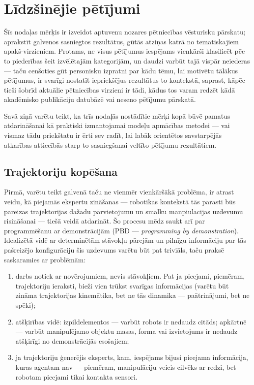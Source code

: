 \documentclass[12pt, a4paper]{article}
\numberwithin{equation}{section} %
\begin{document}
\newpage
\section{Līdzšinējie pētījumi}

Šīs nodaļas mērķis ir izveidot aptuvenu nozares pētniecības vēsturisku pārskatu; aprakstīt galvenos sasniegtos rezultātus, gūtās atziņas katrā no tematiskajiem apakš-virzieniem. Protams, ne visus pētījumus iespējams vienkārši klasificēt pēc to piederības šeit izvēlētajām kategorijām, un daudzi varbūt tajā vispār neiederas --- taču cenšoties gūt personisku izpratni par kādu tēmu, lai motivētu tālākus pētījumus, ir svarīgi nostatīt iepriekšējus rezultātus to kontekstā, saprast, kāpēc tieši šobrīd aktuālie pētniecības virzieni ir tādi, kādus tos varam redzēt kādā akadēmisko publikāciju datubāzē vai neseno pētījumu pārskatā.

Savā ziņā varētu teikt, ka trīs nodaļās nostādītie mērķi kopā būvē pamatus atdarināšanai kā praktiski izmantojamai modeļu apmācības metodei --- vai vismaz tādu priekštatu ir ērti sev radīt, lai labāk orientētos savstarpējās atkarības attiecībās starp to sasniegšanai veltīto pētījumu rezultātiem.

\subsection{Trajektoriju kopēšana}

Pirmā, varētu teikt galvenā taču ne vienmēr vienkāršākā problēma, ir atrast veidu, kā piejamās ekspertu zināšanas --- robotikas kontekstā tās parasti būs pareizas trajektorijas dažādu pārvietojumu un smalku manpiulācijas uzdevumu risināšanai --- tiešā veidā atdarināt. Šo procesu mēdz saukt arī par programmēšanu ar demonstrācijām (PBD --- \textit{programming by demonstration})\cite{muench1994robot,billard2008handbook}. Idealizētā vidē ar determinētām stāvokļu pārejām un pilnīgu informāciju par tās pašreizējo konfigurāciju šis uzdevums varētu būt pat triviāls, taču praksē saskaramies ar problēmām:

\begin{enumerate}
    \item darbs notiek ar novērojumiem, nevis stāvokļiem. Pat ja pieejami, piemēram, trajektoriju ieraksti, bieži vien trūkst svarīgas informācijas (varētu būt zināma trajektorijas kinemātika, bet ne tās dinamika --- paātrinājumi, bet ne spēki);
    \item atšķirības vidē: izpildelementos --- varbūt robots ir nedaudz citāds; apkārtnē --- varbūt manipulējamo objektu masas, forma vai izvietojums ir nedaudz atšķirīgi no demonstrācijās esošajiem;
    \item ja trajektoriju ģenerējis eksperts, kam, iespējams bijusi pieejama informācija, kuras aģentam nav --- piemēram, manipulāciju veicis cilvēks ar redzi, bet robotam pieejami tikai kontakta sensori.
\end{enumerate}
\end{document}
